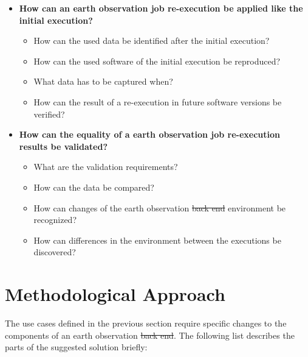 \documentclass[draft,final]{vutinfth} %
\providecommand{\DIFaddtex}[1]{{\protect\color{blue}\uwave{#1}}} %
\providecommand{\DIFdeltex}[1]{{\protect\color{red}\sout{#1}}}                      %
\providecommand{\DIFaddbegin}{} %
\providecommand{\DIFaddend}{} %
\providecommand{\DIFdelbegin}{} %
\providecommand{\DIFdelend}{} %
\providecommand{\DIFadd}[1]{\texorpdfstring{\DIFaddtex{#1}}{#1}} %
\providecommand{\DIFdel}[1]{\texorpdfstring{\DIFdeltex{#1}}{}} %
\begin{document}
\begin{itemize}
	\item \textbf{How can an earth observation job re-execution be applied like the initial execution?}
	\begin{itemize}
		\item How can the used data be identified after the initial execution?
		\item How can the used software of the initial execution be reproduced?
		\item What data has to be captured when?
		\item How can the result of a re-execution in future software versions be verified?
	\end{itemize}
	\item \textbf{How can the equality of a earth observation job re-execution results be validated?}
	\begin{itemize}
		\item What are the validation requirements?
		\item How can the data be compared?
		\item How can changes of the earth observation \DIFdelbegin \DIFdel{back end }\DIFdelend \DIFaddbegin \DIFadd{backend }\DIFaddend environment be recognized?
		\item How can differences in the environment between the executions be discovered?
	\end{itemize}
\end{itemize}

\section{Methodological Approach}\label{Method}
The use cases defined in the previous section require specific changes to the components of an earth observation \DIFdelbegin \DIFdel{back end}\DIFdelend \DIFaddbegin \DIFadd{backend}\DIFaddend . The following list describes the parts of the suggested solution briefly: 
\end{document}
